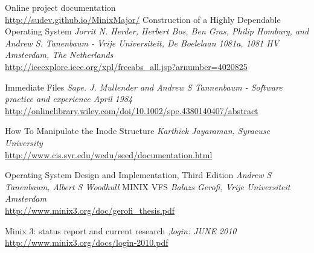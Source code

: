 \cleardoublepage
{}
{}
\begin{thebibliography}{99}
 Online project documentation \\ \url{http://sudev.github.io/MinixMajor/}
 Construction of a Highly Dependable Operating System { \em Jorrit N. Herder, Herbert Bos, Ben Gras, Philip Homburg, and Andrew S. Tanenbaum - Vrije Universiteit, De Boelelaan 1081a, 1081 HV Amsterdam, The Netherlands } \\ \url{http://ieeexplore.ieee.org/xpl/freeabs_all.jsp?arnumber=4020825}

Immediate Files {\em Sape. J. Mullender and Andrew S Tannenbaum - Software practice and experience April 1984 } \\  \url{http://onlinelibrary.wiley.com/doi/10.1002/spe.4380140407/abstract}

 How To Manipulate the Inode Structure  {\em Karthick Jayaraman, Syracuse University } \\ \url {http://www.cis.syr.edu/wedu/seed/documentation.html}

 Operating System Design and Implementation, Third Edition{ \em Andrew S Tanenbaum, Albert S Woodhull }
 MINIX VFS {\em Balazs Gerofi, Vrije Universiteit Amsterdam } \\ \url {http://www.minix3.org/doc/gerofi_thesis.pdf}

 Minix 3: status report and current research { \em ;login: JUNE 2010 } \\
 \url{http://www.minix3.org/docs/login-2010.pdf}



\end{thebibliography}
